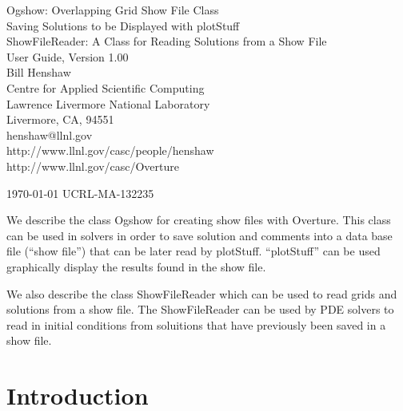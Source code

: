 \documentclass{article}
\newcommand{\Index}[1]{#1\index{#1}}
\begin{document}

%

\vspace{5\baselineskip}
\begin{flushleft}
{\Large
Ogshow: Overlapping Grid Show File Class \\
Saving Solutions to be Displayed with plotStuff \\
ShowFileReader: A Class for Reading Solutions from a Show File \\
\vspace{\baselineskip}
User Guide, Version 1.00  \\
}
\baselineskip
Bill Henshaw \\
\vspace{\baselineskip}
Centre for Applied Scientific Computing \\
Lawrence Livermore National Laboratory    \\
Livermore, CA, 94551   \\
henshaw@llnl.gov \\
http://www.llnl.gov/casc/people/henshaw \\
http://www.llnl.gov/casc/Overture

\vspace{\baselineskip}
\today
\vspace{\baselineskip}
UCRL-MA-132235

\vspace{4\baselineskip}

We describe the class Ogshow for creating show files with Overture.
This class can be used in solvers in order to save solution and comments
into a data base file (``show file'') that can be later read by plotStuff.
``plotStuff'' can be used graphically display the results found in the
show file.

We also describe the class \Index{ShowFileReader} which can be used to read grids
and solutions from a show file. The ShowFileReader can be used by PDE solvers
to read in initial conditions from soluitions that have previously been
saved in a show file.
\end{flushleft}

\tableofcontents

\vfill\eject

\section{Introduction}
\end{document}
